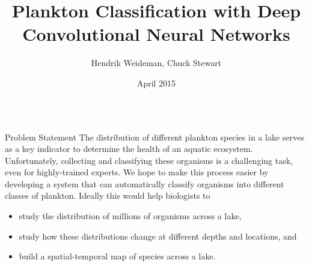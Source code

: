 \documentclass[final,hyperref={pdfpagelabels=false}]{beamer}
\title{\huge Plankton Classification with Deep Convolutional Neural Networks}
\author{Hendrik Weideman, Chuck Stewart}
\institute{Department of Computer Science\\Rensselaer Polytechnic Institute}
\date[April 2015]{April 2015}
\begin{document}
\begin{frame}
  \begin{columns}[T]
  	\begin{column}{.32\textwidth}

      \begin{block}{Problem Statement}
        The distribution of different plankton species in a lake serves as a key indicator to determine the health of an aquatic
        ecosystem.  Unfortunately, collecting and classifying these organisms is a challenging task, even for highly-trained
        experts.
        We hope to make this process easier by developing a system that can automatically classify organisms into different classes of
        plankton.  Ideally this would help biologists to
        \begin{itemize}
          \item study the distribution of millions of organisms across a lake,
          \item study how these distributions change at different depths and locations, and
          \item build a spatial-temporal map of species across a lake.
        \end{itemize}
      \end{block}


\end{column}
\end{columns}
\end{frame}
\end{document}
